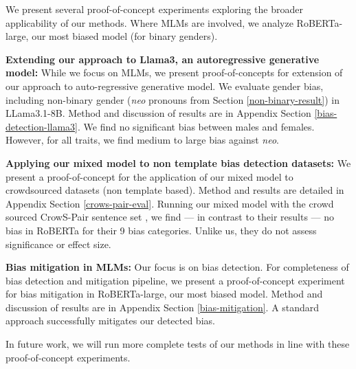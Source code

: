 \noindent We present several proof-of-concept experiments exploring the broader applicability of our methods. Where MLMs are involved, we analyze RoBERTa-large, our most biased model (for binary genders).

\vspace{0.5em}

\noindent \textbf{Extending our approach to Llama3, an autoregressive generative model:} 
%
While we focus on MLMs, we present proof-of-concepts for extension of our approach to auto-regressive generative model. We evaluate gender bias, including non-binary gender (\textit{neo} pronouns from Section \ref{non-binary-result}) in LLama3.1-8B. 
%
Method and discussion of results are in Appendix Section \ref{bias-detection-llama3}.
%
We find no significant bias between males and females. However, for all traits, we find medium to large bias against \textit{neo}. 



\vspace{0.5em}

\noindent \textbf{Applying our mixed model to non template bias detection datasets:} We present a proof-of-concept for the application of our mixed model to crowdsourced datasets (non template based). Method and results are detailed in Appendix Section \ref{crows-pair-eval}.
%
Running our mixed model with the crowd sourced CrowS-Pair sentence set \cite{nangia-etal-2020-crows}, we find  --- in contrast to their results --- no bias in RoBERTa for their 9 bias categories.
%
Unlike us, they do not assess significance or effect size.

\vspace{0.5em}
\noindent \textbf{Bias mitigation in MLMs:} 
%
Our focus is on bias detection. For completeness of bias detection and mitigation pipeline, we present a proof-of-concept experiment for bias mitigation in RoBERTa-large, our most biased model. Method and discussion of results are in Appendix Section \ref{bias-mitigation}.
%
A standard approach \citet{bartl-etal-2020-unmasking} successfully mitigates our detected bias. 

In future work, we will run more complete tests of our methods in line with these proof-of-concept experiments.